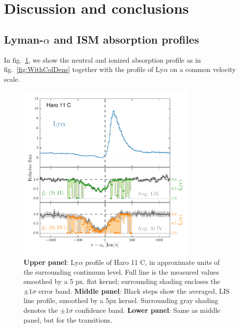 \documentclass[twocolumn]{aastex61}
\begin{document}
\section{Discussion and conclusions}\label{discussion-and-conclusions}

\subsection{Lyman-$\alpha$ and ISM absorption
profiles}\label{sec:LISLya}

In fig.~\ref{fig:HisLisLya}, we show the neutral and ionized absorption
profile as in fig.~\ref{fig:WithColDens} together with the profile of
Ly$\alpha$ on a common velocity scale.

\begin{figure}
\centering
\includegraphics[width=3.500in]{../Figs/LyACoverfracs.pdf}
\caption{\textbf{Upper panel}: Ly$\alpha$ profile of Haro 11 C, in
approximate units of the surrounding continuum level. Full line is the
measured values smoothed by a 5 px. flat kernel; surrounding shading
encloses the $\pm 1 \sigma$ error band. \textbf{Middle panel}: Black
steps show the averaged, LIS line profile, smoothed by a 5px kernel.
Surrounding gray shading denotes the $\pm 1 \sigma$ confidence band.
\textbf{Lower panel}: Same as middle panel, but for the 
transitions. }\label{fig:HisLisLya}
\end{figure}
\end{document}
